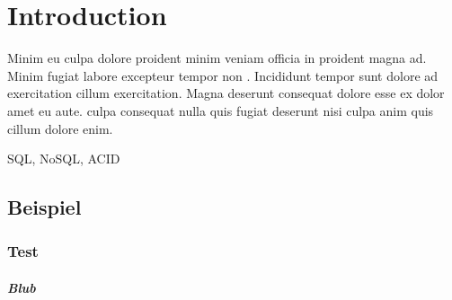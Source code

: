 
\chapter{Introduction} \label{ch:introduction}

Minim eu culpa dolore proident minim veniam officia in proident magna ad. Minim fugiat labore excepteur tempor non \cite{test.2022}. Incididunt tempor sunt dolore ad exercitation cillum exercitation. Magna deserunt consequat dolore esse ex dolor amet eu aute. \textcite{test.2022} culpa consequat nulla quis fugiat deserunt nisi culpa anim quis cillum dolore enim.

\ac{SQL}, \ac{NoSQL}, \ac{ACID}

\section{Beispiel} \label{sec:beispiel}

\subsection{Test} \label{subsec:test}

\paragraph{Blub} \label{par:blub}